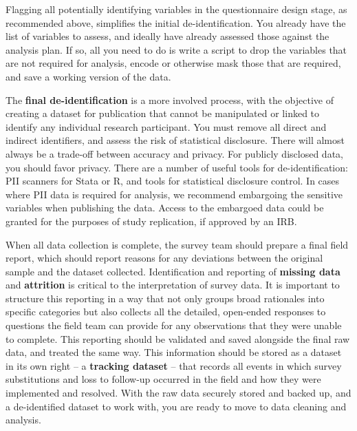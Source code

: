 Flagging all potentially identifying variables in the questionnaire design stage,
as recommended above, simplifies the initial de-identification.
You already have the list of variables to assess,
and ideally have already assessed those against the analysis plan.
If so, all you need to do is write a script to drop the variables that are not required for analysis,
encode or otherwise mask those that are required, and save a working version of the data.

The \textbf{final de-identification} is a more involved process,
with the objective of creating a dataset for publication
that cannot be manipulated or linked to identify any individual research participant.
You must remove all direct and indirect identifiers, and assess the risk of statistical disclosure.
There will almost always be a trade-off between accuracy and privacy.
For publicly disclosed data, you should favor privacy.
There are a number of useful tools for de-identification: PII scanners for Stata
or R,
and tools for statistical disclosure control.
In cases where PII data is required for analysis,
we recommend embargoing the sensitive variables when publishing the data.
Access to the embargoed data could be granted for the purposes of study replication, if approved by an IRB.

When all data collection is complete, the survey team should prepare a final field report,
which should report reasons for any deviations between the original sample and the dataset collected.
Identification and reporting of \textbf{missing data} and \textbf{attrition}
is critical to the interpretation of survey data.
It is important to structure this reporting in a way that not only
groups broad rationales into specific categories
but also collects all the detailed, open-ended responses
to questions the field team can provide for any observations that they were unable to complete.
This reporting should be validated and saved alongside the final raw data, and treated the same way.
This information should be stored as a dataset in its own right
-- a \textbf{tracking dataset} -- that records all events in which survey substitutions
and loss to follow-up occurred in the field and how they were implemented and resolved.
With the raw data securely stored and backed up,
and a de-identified dataset to work with, you are ready to move to data cleaning and analysis.